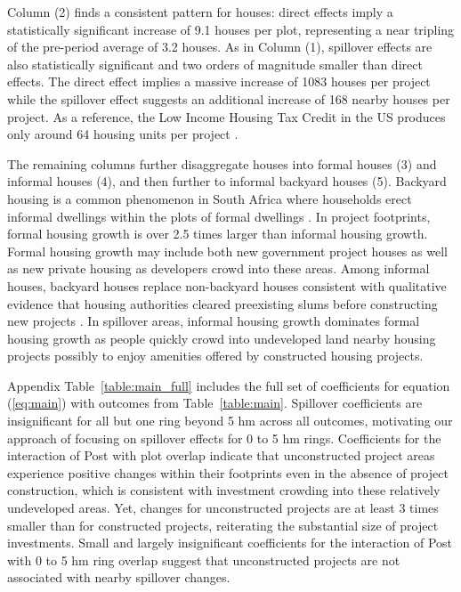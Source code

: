 \documentclass[12pt]{article}
\begin{document}
Column (2) finds a consistent pattern for houses: direct effects imply a statistically significant increase of 9.1 houses per plot, representing a near tripling of the pre-period average of 3.2 houses.  As in Column (1), spillover effects are also statistically significant and two orders of magnitude smaller than direct effects.  The direct effect implies a massive increase of 1083 houses per project while the spillover effect suggests an additional increase of 168 nearby houses per project.  As a reference, the Low Income Housing Tax Credit in the US produces only around 64 housing units per project \citep{diamond2016wants}.

The remaining columns further disaggregate houses into formal houses (3) and informal houses (4), and then further to informal backyard houses (5).  Backyard housing is a common phenomenon in South Africa where households erect informal dwellings within the plots of formal dwellings \citep{Brueckner2018backyarding}.  In project footprints, formal housing growth is over 2.5 times larger than informal housing growth.  Formal housing growth may include both new government project houses as well as new private housing as developers crowd into these areas.  Among informal houses, backyard houses replace non-backyard houses consistent with qualitative evidence that housing authorities cleared preexisting slums before constructing new projects \citep{hofmeyr2008risk}.  In spillover areas, informal housing growth dominates formal housing growth as people quickly crowd into undeveloped land nearby housing projects possibly to enjoy amenities offered by constructed housing projects.

Appendix Table~\ref{table:main_full} includes the full set of coefficients for equation (\ref{eq:main}) with outcomes from  Table~\ref{table:main}.  Spillover coefficients are insignificant for all but one ring beyond 5 hm across all outcomes, motivating our approach of focusing on spillover effects for 0 to 5 hm rings.  Coefficients for the interaction of Post with plot overlap indicate that unconstructed project areas experience positive changes within their footprints even in the absence of project construction, which is consistent with investment crowding into these relatively undeveloped areas.  Yet, changes for unconstructed projects are at least 3 times smaller than for constructed projects, reiterating the substantial size of project investments.  Small and largely insignificant coefficients for the interaction of Post with 0 to 5 hm ring overlap suggest that unconstructed projects are not associated with nearby spillover changes.  
\end{document}
